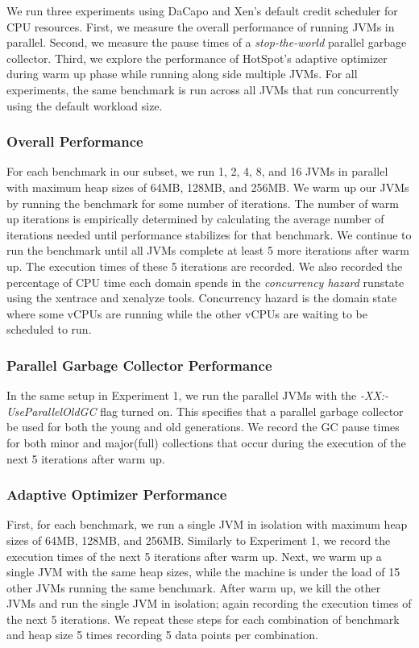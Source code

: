 \documentclass{sig-alternate}
\begin{document}
We run three experiments using DaCapo and Xen's default credit scheduler for CPU resources. First, we measure the overall performance of running JVMs in parallel. Second, we measure the pause times of a \textit{stop-the-world} parallel garbage collector. Third, we explore the performance of HotSpot's adaptive optimizer during warm up phase while running along side multiple JVMs. For all experiments, the same benchmark is run across all JVMs that run concurrently using the default workload size.

\subsubsection{Overall Performance} \label{sssec:overallperf}
For each benchmark in our subset, we run 1, 2, 4, 8, and 16 JVMs in parallel with maximum heap sizes of 64MB, 128MB, and 256MB. We warm up our JVMs by running the benchmark for some number of iterations. The number of warm up iterations is empirically determined by calculating the average number of iterations needed until performance stabilizes for that benchmark. We continue to run the benchmark until all JVMs complete at least 5 more iterations after warm up.  The execution times of these 5 iterations are recorded. We also recorded the percentage of CPU time each domain spends in the \textit{concurrency hazard} runstate using the xentrace and xenalyze tools. Concurrency hazard is the domain state where some vCPUs are running while the other vCPUs are waiting to be scheduled to run. 

\subsubsection{Parallel Garbage Collector Performance}
In the same setup in Experiment 1, we run the parallel JVMs with the \textit{-XX:-UseParallelOldGC} flag turned on. This specifies that a parallel garbage collector be used for both the young and old generations. We record the GC pause times for both minor and major(full) collections that occur during the execution of the next 5 iterations after warm up.

\subsubsection{Adaptive Optimizer Performance}
First, for each benchmark, we run a single JVM in isolation with maximum heap sizes of 64MB, 128MB, and 256MB. Similarly to Experiment 1, we record the execution times of the next 5 iterations after warm up. Next, we warm up a single JVM with the same heap sizes, while the machine is under the load of 15 other JVMs running the same benchmark. After warm up, we kill the other JVMs and run the single JVM in isolation; again recording the execution times of the next 5 iterations. We repeat these steps for each combination of benchmark and heap size 5 times recording 5 data points per combination.
\end{document}
